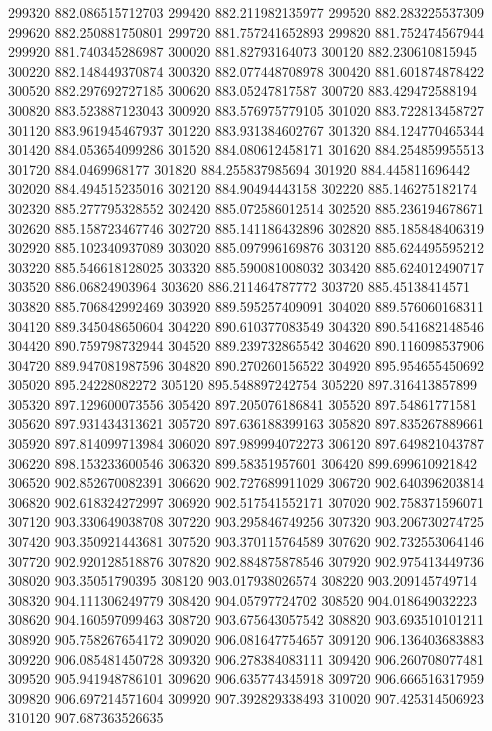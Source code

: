 {299320 882.086515712703
299420 882.211982135977
299520 882.283225537309
299620 882.250881750801
299720 881.757241652893
299820 881.752474567944
299920 881.740345286987
300020 881.82793164073
300120 882.230610815945
300220 882.148449370874
300320 882.077448708978
300420 881.601874878422
300520 882.297692727185
300620 883.05247817587
300720 883.429472588194
300820 883.523887123043
300920 883.576975779105
301020 883.722813458727
301120 883.961945467937
301220 883.931384602767
301320 884.124770465344
301420 884.053654099286
301520 884.080612458171
301620 884.254859955513
301720 884.0469968177
301820 884.255837985694
301920 884.445811696442
302020 884.494515235016
302120 884.90494443158
302220 885.146275182174
302320 885.277795328552
302420 885.072586012514
302520 885.236194678671
302620 885.158723467746
302720 885.141186432896
302820 885.185848406319
302920 885.102340937089
303020 885.097996169876
303120 885.624495595212
303220 885.546618128025
303320 885.590081008032
303420 885.624012490717
303520 886.06824903964
303620 886.211464787772
303720 885.45138414571
303820 885.706842992469
303920 889.595257409091
304020 889.576060168311
304120 889.345048650604
304220 890.610377083549
304320 890.541682148546
304420 890.759798732944
304520 889.239732865542
304620 890.116098537906
304720 889.947081987596
304820 890.270260156522
304920 895.954655450692
305020 895.24228082272
305120 895.548897242754
305220 897.316413857899
305320 897.129600073556
305420 897.205076186841
305520 897.54861771581
305620 897.931434313621
305720 897.636188399163
305820 897.835267889661
305920 897.814099713984
306020 897.989994072273
306120 897.649821043787
306220 898.153233600546
306320 899.58351957601
306420 899.699610921842
306520 902.852670082391
306620 902.727689911029
306720 902.640396203814
306820 902.618324272997
306920 902.517541552171
307020 902.758371596071
307120 903.330649038708
307220 903.295846749256
307320 903.206730274725
307420 903.350921443681
307520 903.370115764589
307620 902.732553064146
307720 902.920128518876
307820 902.884875878546
307920 902.975413449736
308020 903.35051790395
308120 903.017938026574
308220 903.209145749714
308320 904.111306249779
308420 904.05797724702
308520 904.018649032223
308620 904.160597099463
308720 903.675643057542
308820 903.693510101211
308920 905.758267654172
309020 906.081647754657
309120 906.136403683883
309220 906.085481450728
309320 906.278384083111
309420 906.260708077481
309520 905.941948786101
309620 906.635774345918
309720 906.666516317959
309820 906.697214571604
309920 907.392829338493
310020 907.425314506923
310120 907.687363526635
}
